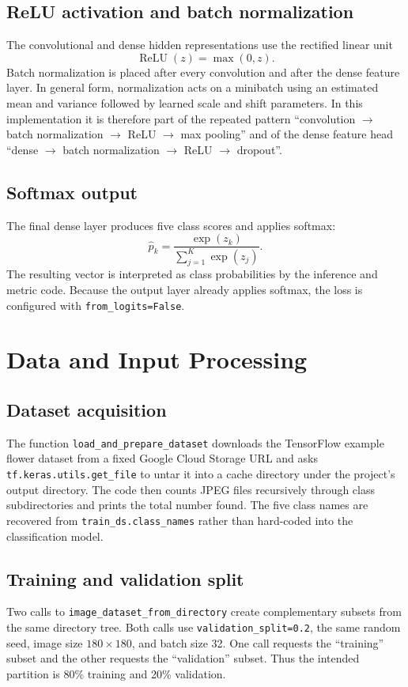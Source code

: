 \documentclass[11pt,a4paper]{article}
\newcommand{\code}[1]{\texttt{#1}}
\begin{document}
\subsection{ReLU activation and batch normalization}
The convolutional and dense hidden representations use the rectified linear unit
\begin{equation}
\operatorname{ReLU}(z)=\max(0,z).
\end{equation}
Batch normalization is placed after every convolution and after the dense feature layer. In general form, normalization acts on a minibatch using an estimated mean and variance followed by learned scale and shift parameters. In this implementation it is therefore part of the repeated pattern ``convolution $\rightarrow$ batch normalization $\rightarrow$ ReLU $\rightarrow$ max pooling'' and of the dense feature head ``dense $\rightarrow$ batch normalization $\rightarrow$ ReLU $\rightarrow$ dropout''.

\subsection{Softmax output}
The final dense layer produces five class scores and applies softmax:
\begin{equation}
\hat{p}_k
=
\frac{\exp(z_k)}{\sum_{j=1}^{K}\exp(z_j)}.
\end{equation}
The resulting vector is interpreted as class probabilities by the inference and metric code. Because the output layer already applies softmax, the loss is configured with \code{from\_logits=False}.

\section{Data and Input Processing}
\subsection{Dataset acquisition}
The function \code{load\_and\_prepare\_dataset} downloads the TensorFlow example flower dataset from a fixed Google Cloud Storage URL and asks \code{tf.keras.utils.get\_file} to untar it into a cache directory under the project's output directory. The code then counts JPEG files recursively through class subdirectories and prints the total number found. The five class names are recovered from \code{train\_ds.class\_names} rather than hard-coded into the classification model.

\subsection{Training and validation split}
Two calls to \code{image\_dataset\_from\_directory} create complementary subsets from the same directory tree. Both calls use \code{validation\_split=0.2}, the same random seed, image size $180\times180$, and batch size 32. One call requests the ``training'' subset and the other requests the ``validation'' subset. Thus the intended partition is 80\% training and 20\% validation.
\end{document}

